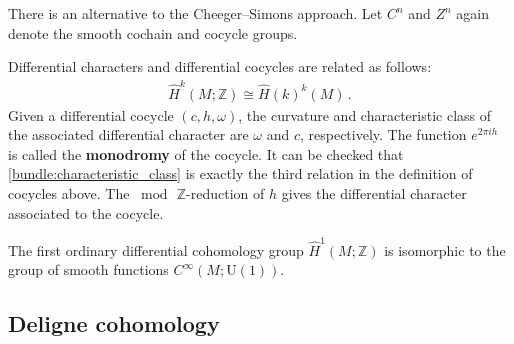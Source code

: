     There is an alternative to the Cheeger--Simons approach. Let $C^n$ and $Z^n$ again denote the smooth cochain and cocycle groups.
    \begin{property}
        Differential characters and differential cocycles are related as follows:
        \begin{gather}
            \widehat{H}^k(M;\mathbb{Z})\cong\widehat{H}(k)^k(M)\,.
        \end{gather}
        Given a differential cocycle $(c,h,\omega)$, the curvature and characteristic class of the associated differential character are $\omega$ and $c$, respectively. The function $e^{2\pi ih}$ is called the \textbf{monodromy} of the cocycle. It can be checked that \cref{bundle:characteristic_class} is exactly the third relation in the definition of cocycles above. The $\bmod\,\mathbb{Z}$-reduction of $h$ gives the differential character associated to the cocycle.
    \end{property}

    \begin{example}
        The first ordinary differential cohomology group $\widehat{H}^1(M;\mathbb{Z})$ is isomorphic to the group of smooth functions $C^\infty(M;\mathrm{U}(1))$.
    \end{example}

\subsection{Deligne cohomology}

